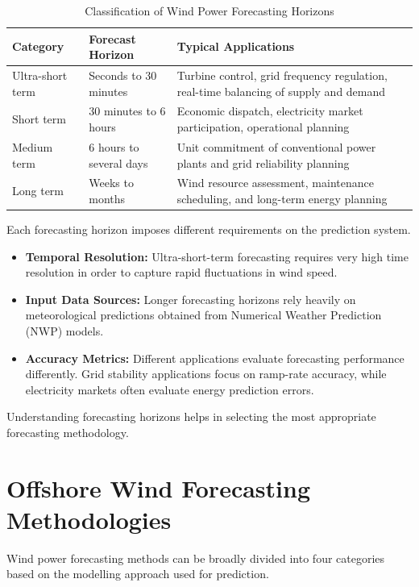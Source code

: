 \documentclass[12pt,a4paper]{article}
\begin{document}
\begin{table}[H]
\centering
\caption{Classification of Wind Power Forecasting Horizons}
\label{tab:horizons}
\begin{tabular}{|p{3.5cm}|p{3.5cm}|p{8cm}|}
\hline
\textbf{Category} & \textbf{Forecast Horizon} & \textbf{Typical Applications} \\
\hline
Ultra-short term & Seconds to 30 minutes & Turbine control, grid frequency regulation, real-time balancing of supply and demand \\
\hline
Short term & 30 minutes to 6 hours & Economic dispatch, electricity market participation, operational planning \\
\hline
Medium term & 6 hours to several days & Unit commitment of conventional power plants and grid reliability planning \\
\hline
Long term & Weeks to months & Wind resource assessment, maintenance scheduling, and long-term energy planning \\
\hline
\end{tabular}
\end{table}
Each forecasting horizon imposes different requirements on the prediction system.

\begin{itemize}
\item \textbf{Temporal Resolution:} Ultra-short-term forecasting requires very high time resolution in order to capture rapid fluctuations in wind speed.

\item \textbf{Input Data Sources:} Longer forecasting horizons rely heavily on meteorological predictions obtained from Numerical Weather Prediction (NWP) models.

\item \textbf{Accuracy Metrics:} Different applications evaluate forecasting performance differently. Grid stability applications focus on ramp-rate accuracy, while electricity markets often evaluate energy prediction errors.
\end{itemize}

Understanding forecasting horizons helps in selecting the most appropriate forecasting methodology.

\section{Offshore Wind Forecasting Methodologies}

Wind power forecasting methods can be broadly divided into four categories based on the modelling approach used for prediction.
\end{document}
